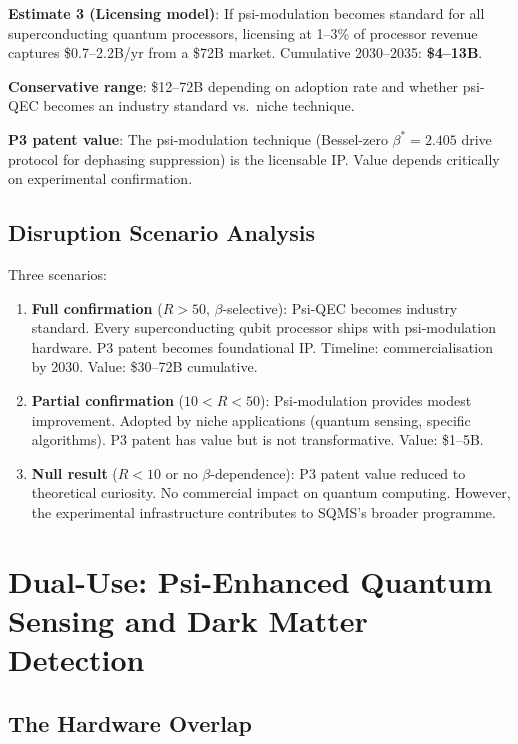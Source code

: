 \documentclass[11pt]{article}
\theoremstyle{definition}
\theoremstyle{remark}
\begin{document}
\textbf{Estimate 3 (Licensing model)}: If psi-modulation becomes
standard for all superconducting quantum processors, licensing at
1--3\% of processor revenue captures \$0.7--2.2B/yr from a \$72B
market. Cumulative 2030--2035: \textbf{\$4--13B}.

\textbf{Conservative range}: \$12--72B depending on adoption rate and
whether psi-QEC becomes an industry standard vs.\ niche technique.

\textbf{P3 patent value}: The psi-modulation technique (Bessel-zero
$\beta^* = 2.405$ drive protocol for dephasing suppression) is the
licensable IP. Value depends critically on experimental confirmation.

\subsection{Disruption Scenario Analysis}

Three scenarios:

\begin{enumerate}
\item \textbf{Full confirmation} ($R > 50$, $\beta$-selective):
  Psi-QEC becomes industry standard. Every superconducting qubit
  processor ships with psi-modulation hardware. P3 patent becomes
  foundational IP. Timeline: commercialisation by 2030. Value:
  \$30--72B cumulative.

\item \textbf{Partial confirmation} ($10 < R < 50$): Psi-modulation
  provides modest improvement. Adopted by niche applications
  (quantum sensing, specific algorithms). P3 patent has value but
  is not transformative. Value: \$1--5B.

\item \textbf{Null result} ($R < 10$ or no $\beta$-dependence):
  P3 patent value reduced to theoretical curiosity. No commercial
  impact on quantum computing. However, the experimental infrastructure
  contributes to SQMS's broader programme.
\end{enumerate}

\section{Dual-Use: Psi-Enhanced Quantum Sensing and Dark Matter Detection}
\label{sec:dual-use}

\subsection{The Hardware Overlap}
\end{document}
